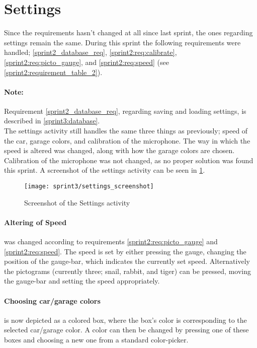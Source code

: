 \section{Settings}\label{sprint3:settings}

Since the requirements hasn't changed at all since last sprint, the ones regarding settings remain the same.
During this sprint the following requirements were handled; \ref{sprint2_database_req}, \ref{sprint2:req:calibrate}, \ref{sprint2:req:picto_gauge}, and \ref{sprint2:req:speed} (see \cref{sprint2:requirement_table_2}).

\paragraph{Note:} Requirement \ref{sprint2_database_req}, regarding saving and loading settings, is described in \ref{sprint3:database}.\\

\noindent
The settings activity still handles the same three things as previously; speed of the car, garage colors, and calibration of the microphone.
The way in which the speed is altered was changed, along with how the garage colors are chosen.
Calibration of the microphone was not changed, as no proper solution was found this sprint.
A screenshot of the settings activity can be seen in \cref{sprint3:settings:screenshot}.

\begin{figure}
\texttt{[image: sprint3/settings\_screenshot]}
\caption{Screenshot of the Settings activity}
\label{sprint3:settings:screenshot}
\end{figure}

\paragraph{Altering of Speed} was changed according to requirements \ref{sprint2:req:picto_gauge} and \ref{sprint2:req:speed}.
The speed is set by either pressing the gauge, changing the position of the gauge-bar, which indicates the currently set speed.
Alternatively the pictograms (currently three; snail, rabbit, and tiger) can be pressed, moving the gauge-bar and setting the speed appropriately.

\paragraph{Choosing car/garage colors} is now depicted as a colored box, where the box's color is corresponding to the selected car/garage color.
A color can then be changed by pressing one of these boxes and choosing a new one from a standard color-picker.